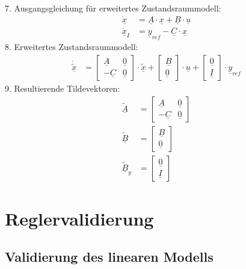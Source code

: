 \documentclass[
	pagesize,
	fontsize=12pt,
	paper=a4,
	oneside,
   reqno
]{scrartcl}
\begin{document}
7. Ausgangsgleichung für erweitertes Zustandsraummodell:
\begin{align*}
    \underline{\dot{x}} &= \underline{A}\cdot\underline{x}+\underline{B}\cdot\underline{u} \\
    \underline{\dot{x}}_{I} &= \underline{y}_{ref}-\underline{C}\cdot\underline{x}
\end{align*}
8. Erweitertes Zustandsraummodell:
\begin{align*}
    \underline{\dot{\tilde{x}}} &= 
    \begin{bmatrix}
        \underline{A} & \underline{0} \\
        -\underline{C} & \underline{0}
    \end{bmatrix} \cdot \underline{\tilde{x}} +
    \begin{bmatrix}
        \underline{B} \\
        \underline{0}
    \end{bmatrix} \cdot\underline{u} +
    \begin{bmatrix}
        \underline{0} \\
        \underline{I}
    \end{bmatrix} \cdot\underline{y}_{ref}
\end{align*}
9. Resultierende Tildevektoren:
\begin{align*}
    \underline{\tilde{A}} &= 
    \begin{bmatrix}
        \underline{A} & \underline{0} \\
        -\underline{C} & \underline{0}
    \end{bmatrix} \\
    \underline{\tilde{B}} &= 
    \begin{bmatrix}
        \underline{B} \\
        \underline{0}
    \end{bmatrix} \\
    \underline{\tilde{B}}_{y} &= 
    \begin{bmatrix}
        \underline{0} \\
        \underline{I}
    \end{bmatrix}
\end{align*}


\clearpage

\section{Reglervalidierung}

\subsection{Validierung des linearen Modells}
\end{document}
